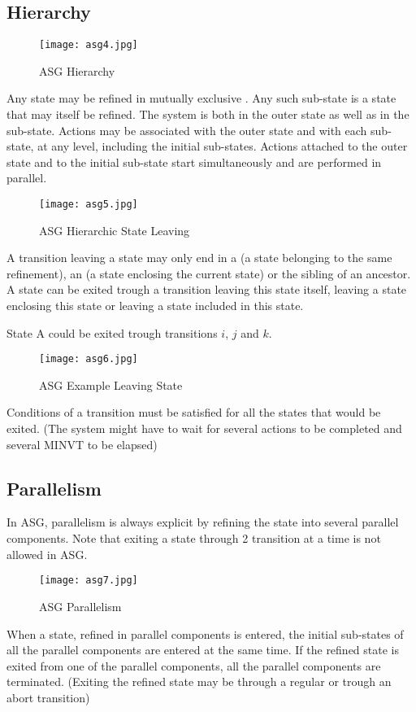 \documentclass[../main.tex]{subfiles}
\begin{document}
\subsection{Hierarchy}
\begin{figure}[H]
    \centering
    \texttt{[image: asg4.jpg]}
    \caption{ASG Hierarchy}
    \label{asg4}
\end{figure}
Any state may be refined in mutually exclusive .
Any such sub-state is a state that may itself be refined.
The system is both in the outer state as well as in the sub-state.
Actions may be associated with the outer state and with each sub-state, at any level, including the initial sub-states.
Actions attached to the outer state and to the initial sub-state start simultaneously and are performed in parallel.
\begin{figure}[H]
    \centering
    \texttt{[image: asg5.jpg]}
    \caption{ASG Hierarchic State Leaving}
    \label{asg5}
\end{figure}
A transition leaving a state may only end in a  (a state belonging to the same refinement), an  (a state enclosing the current state) or the sibling of an ancestor.
A state can be exited trough a transition leaving this state itself, leaving a state enclosing this state or leaving a state included in this state.
\begin{exmp}
State A could be exited trough transitions $i$, $j$ and $k$.
\begin{figure}[H]
    \centering
    \texttt{[image: asg6.jpg]}
    \caption{ASG Example Leaving State}
    \label{asg6}
\end{figure}
\end{exmp}
Conditions of a transition must be satisfied for all the states that would be exited.
(The system might have to wait for several actions to be completed and several MINVT to be elapsed)

\subsection{Parallelism}
In ASG, parallelism is always explicit by refining the state into several parallel components. Note that exiting a state through 2 transition at a time is not allowed in ASG.

\begin{figure}[H]
    \centering
    \texttt{[image: asg7.jpg]}
    \caption{ASG Parallelism}
    \label{asg7}
\end{figure}
When a state, refined in parallel components is entered, the initial sub-states of all the parallel components are entered at the same time.
If the refined state is exited from one of the parallel components, all the parallel components are terminated.
(Exiting the refined state may be through a regular or trough an abort transition)
\end{document}

